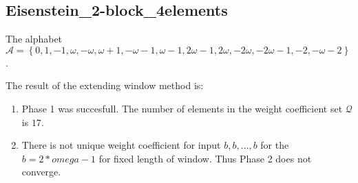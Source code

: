 \subsection{ Eisenstein\_2-block\_4elements }

\label{subsec:Eisenstein2-block4elements}

The alphabet $\mathcal{A} =\left\{0, 1, -1, \omega, -\omega, \omega + 1, -\omega - 1, \omega - 1, 2\omega - 1, 2\omega, -2\omega, -2\omega - 1, -2, -\omega - 2\right\}$.

\noindent The result of the extending window method is:
\begin{enumerate}
    \item Phase 1 was succesfull.
The number of elements in the weight coefficient set $\mathcal{Q}$ is $17$.

    \item There is not unique weight coefficient for input $b,b,\dots,b$ for the $b= 2*omega - 1 $ for fixed length of window. Thus Phase 2 does not converge.

\end{enumerate}
